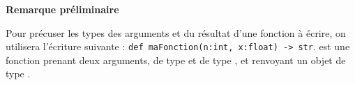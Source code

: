 
\textbf{Remarque préliminaire}

Pour précuser les types des arguments et du résultat d'une fonction à écrire, on utilisera l'écriture suivante : 
\texttt{def maFonction(n:int, x:float) -> str}.  est une fonction prenant deux arguments,  de type  et  de type , et renvoyant un objet de type .












